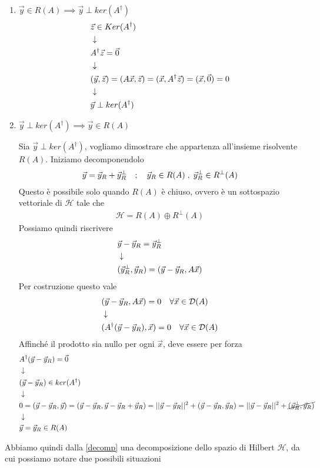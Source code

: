 \begin{enumerate}
	\item $ \vec{y} \in R(A)  \implies \vec{y} \perp ker(A^\dagger)$
	\begin{align}
		&\vec{z} \in Ker(A^\dagger) \\ &\downarrow \nonumber \\
		&A^\dagger \vec{z} = \vec{0} \nonumber \\ &\downarrow \nonumber \\
		&(\vec{y}, \vec{z}) = (A\vec{x}, \vec{z}) = (\vec{x}, A^\dagger\vec{z}) = (\vec{x}, \vec{0}) = 0 \\ &\downarrow \nonumber \\
		&\vec{y} \perp ker(A^\dagger)
	\end{align}
	
	\item $\vec{y} \perp ker(A^\dagger) \implies \vec{y} \in R(A)$
	
	Sia $\vec{y} \perp ker(A^\dagger)$, vogliamo dimostrare che appartenza all'insieme risolvente $R(A)$. Iniziamo decomponendolo
	\begin{align}
		\vec{y} = \vec{y}_R + \vec{y}_R^\perp \quad ; \quad \vec{y}_R \in R(A) \; , \; \vec{y}_R^\perp \in R^\perp (A)
	\end{align}
	Questo è possibile solo quando $R(A)$ è chiuso, ovvero è un sottospazio vettoriale di $\mathcal{H}$ tale che
	\begin{align}
		\mathcal{H} = R(A) \oplus R^\perp(A) \label{decomp}
	\end{align}	
	Possiamo quindi riscrivere
	\begin{align}
		&\vec{y} - \vec{y}_R = \vec{y}_R^\perp \\ &\downarrow \nonumber \\
		&(\vec{y}_R^\perp, \vec{y}_R) = (\vec{y} - \vec{y}_R, A \vec{x})
	\end{align}
	Per costruzione questo vale
	\begin{align}
		&(\vec{y} - \vec{y}_R, A \vec{x}) = 0 \quad \forall \vec{x} \in \mathcal{D}(A) \\ &\downarrow \nonumber \\
		&(A^\dagger(\vec{y} - \vec{y}_R),\vec{x}) = 0 \quad \forall \vec{x} \in \mathcal{D}(A)  
	\end{align}
	Affinché il prodotto sia nullo per ogni $\vec{x}$, deve essere per forza
	\begin{align}
		&A^\dagger(\vec{y} - \vec{y}_R) = \vec{0} \\ &\downarrow \nonumber \\
		&(\vec{y} - \vec{y}_R) \in ker(A^\dagger) \nonumber \\ &\downarrow \nonumber \\
		&0 = (\vec{y} - \vec{y}_R, \vec{y}) = (\vec{y} - \vec{y}_R, \vec{y}- \vec{y}_R + \vec{y}_R) = || \vec{y} - \vec{y}_R||^2 + (\vec{y} - \vec{y}_R, \vec{y}_R) =  || \vec{y} - \vec{y}_R||^2 + \cancel{(\vec{y}_R^\perp, \vec{y}_R)} \nonumber \\ &\downarrow \nonumber \\
		&\vec{y} = \vec{y}_R \in R(A) 
	\end{align}
\end{enumerate}
Abbiamo quindi dalla \ref{decomp} una decomposizione dello spazio di Hilbert $\mathcal{H}$, da cui possiamo notare due possibili situazioni
